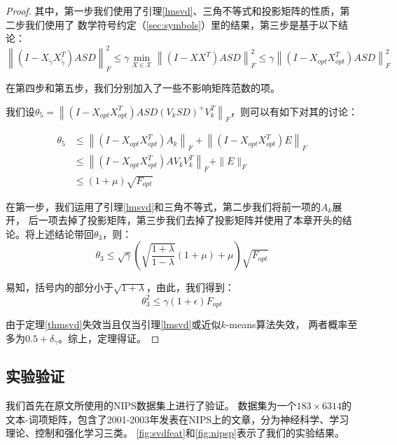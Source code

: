 \documentclass{ctexart}
\begin{document}
\begin{proof}
        其中，第一步我们使用了引理\autoref{lmsvd}、三角不等式和投影矩阵的性质，第二步我们使用了
        数学符号约定（\autoref{sec:symbols}）里的结果，第三步是基于以下结论：
        $$
        \left\|\left(I-X_{\tilde{\gamma}} X_{\tilde{\gamma}}^{T}\right) A S D\right\|_{F}^{2} \leq \gamma \min _{X \in \mathcal{X}}\left\|\left(I-X X^{T}\right) A S D\right\|_{F}^{2} \leq \gamma\left\|\left(I-X_{o p t} X_{o p t}^{T}\right) A S D\right\|_{F}^{2}
        $$

        在第四步和第五步，我们分别加入了一些不影响矩阵范数的项。

        我们设$\theta_5 = \left\|\left(I-X_{o p t} X_{o p t}^{T}\right) A S D\left(V_{k} S D\right)^{+} V_{k}^{T}\right\|_{F}$，则可以有如下对其的讨论：

        $$
        \begin{aligned} \theta_{5} & \leq\left\|\left(I-X_{o p t} X_{o p t}^{T}\right) A_{k}\right\|_{F}+\left\|\left(I-X_{o p t} X_{o p t}^{T}\right) E\right\|_{F} \\ & \leq\left\|\left(I-X_{o p t} X_{o p t}^{T}\right) A V_{k} V_{k}^{T}\right\|_{F}+\|E\|_{F} \\ & \leq(1+\mu) \sqrt{F_{o p t}} \end{aligned}
        $$

        在第一步，我们运用了引理\autoref{lmsvd}和三角不等式，第二步我们将前一项的$A_k$展开，
        后一项去掉了投影矩阵，第三步我们去掉了投影矩阵并使用了本章开头的结论。将上述结论带回$\theta_3$，则：
        $$
        \theta_{3} \leq \sqrt{\gamma}(\sqrt{\frac{1+\lambda}{1-\lambda}}(1+\mu)+\mu) \sqrt{F_{o p t}}
        $$

        易知，括号内的部分小于$\sqrt{1 + \lambda}$，由此，我们得到：
        $$
        \theta_{3}^{2} \leq \gamma(1+\epsilon) F_{o p t}
        $$

        由于定理\autoref{thmsvd}失效当且仅当引理\autoref{lmsvd}或近似$k$-means算法失效，
        两者概率至多为$0.5+\delta_\gamma$。综上，定理得证。
    \end{proof}
    \subsection{实验验证}
    \label{sec:svdexp}
    我们首先在原文所使用的NIPS数据集\cite{chechik2007eec}上进行了验证。
    数据集为一个$183 \times 6314$的文本-词项矩阵，包含了2001-2003年发表在NIPS上的文章，分为神经科学、学习理论、控制和强化学习三类。
    \autoref{fig:svdfeat}和\autoref{fig:nipsp}表示了我们的实验结果。
\end{document}
